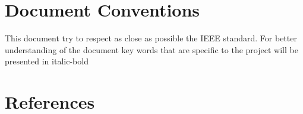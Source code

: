 \documentclass{scrreprt}
\begin{document}
\section{Document Conventions}

This document try to respect as close as possible the IEEE standard.
For better understanding of the document key words that are specific to the
project will be presented in italic-bold





\section{References}
\end{document}
